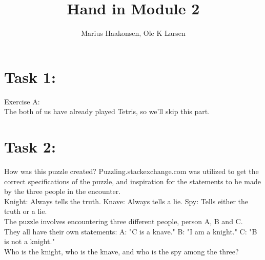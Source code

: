 \documentclass[11pt]{amsart}
\title{Hand in Module 2}
\author{Marius Haakonsen, Ole K Larsen}
\begin{document}
\maketitle

\section{Task 1:}

Exercise A:  \\
The both of us have already played Tetris, so we'll skip this part.  \\




\section{Task 2:}

How was this puzzle created?
	Puzzling.stackexchange.com was utilized to get the correct specifications of the puzzle,
	and inspiration for the statements to be made by the three people in the encounter. \\

Knight: Always tells the truth.
Knave: 	Always tells a lie.
Spy: 	Tells either the truth or a lie. \\

The puzzle involves encountering three different people, person A, B and C. \\

They all have their own statements:
	A: "C is a knave."
	B: "I am a knight."
	C: "B is not a knight." \\

Who is the knight, who is the knave, and who is the spy among the three? \\
\end{document}
